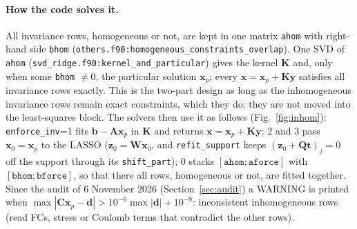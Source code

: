 \documentclass[11pt,a4paper]{article}
\newcommand{\bA}{\mathbf A}
\newcommand{\bC}{\mathbf C}
\newcommand{\bK}{\mathbf K}
\newcommand{\bQ}{\mathbf Q}
\newcommand{\bW}{\mathbf W}
\newcommand{\bx}{\mathbf x}
\newcommand{\by}{\mathbf y}
\newcommand{\bz}{\mathbf z}
\newcommand{\bt}{\mathbf t}
\newcommand{\bb}{\mathbf b}
\newcommand{\bd}{\mathbf d}
\newcommand{\code}[1]{\texttt{#1}}
\begin{document}
\paragraph{How the code solves it.} All invariance rows, homogeneous or not, are kept in one matrix \code{ahom} with
right-hand side \code{bhom} (\code{others.f90:homogeneous\_constraints\_overlap}). One SVD of \code{ahom}
(\code{svd\_ridge.f90:kernel\_and\_particular}) gives the kernel $\bK$ and, only when some \code{bhom} $\ne0$, the
particular solution $\bx_p$; every $\bx=\bx_p+\bK\by$ satisfies all invariance rows exactly. This is the two-part
design as long as the inhomogeneous invariance rows remain exact constraints, which they do: they are not moved into
the least-squares block. The solvers then use it as follows (Fig.~\ref{fig:inhom}):
\code{enforce\_inv}=1 fits $\bb-\bA\bx_p$ in $\bK$ and returns $\bx=\bx_p+\bK\by$; 2 and 3 pass $\bx_0=\bx_p$ to the LASSO
($\bz_0=\bW\bx_0$, and \code{refit\_support} keeps $(\bz_0+\bQ\bt)_j=0$ off the support through its \code{shift\_part});
0 stacks $[\code{ahom};\code{aforce}]$ with $[\code{bhom};\code{bforce}]$, so that there all rows, homogeneous or not,
are fitted together. Since the audit of 6 November 2026 (Section~\ref{sec:audit}) a WARNING is printed when
$\max|\bC\bx_p-\bd|>10^{-6}\max|\bd|+10^{-8}$: inconsistent inhomogeneous rows (read FCs, stress or Coulomb terms that
contradict the other rows).
\end{document}
